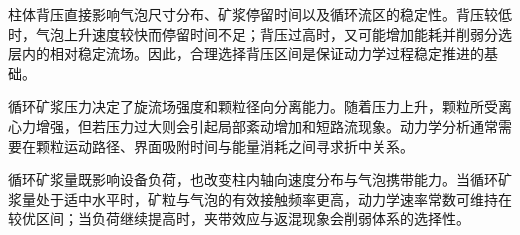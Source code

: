 \label{chap:kinetics}


柱体背压直接影响气泡尺寸分布、矿浆停留时间以及循环流区的稳定性。背压较低时，气泡上升速度较快而停留时间不足；背压过高时，又可能增加能耗并削弱分选层内的相对稳定流场。因此，合理选择背压区间是保证动力学过程稳定推进的基础。


循环矿浆压力决定了旋流场强度和颗粒径向分离能力。随着压力上升，颗粒所受离心力增强，但若压力过大则会引起局部紊动增加和短路流现象。动力学分析通常需要在颗粒运动路径、界面吸附时间与能量消耗之间寻求折中关系。


循环矿浆量既影响设备负荷，也改变柱内轴向速度分布与气泡携带能力。当循环矿浆量处于适中水平时，矿粒与气泡的有效接触频率更高，动力学速率常数可维持在较优区间；当负荷继续提高时，夹带效应与返混现象会削弱体系的选择性。

